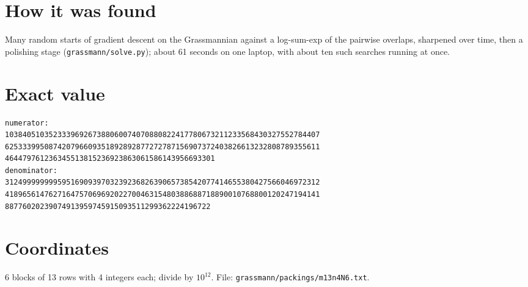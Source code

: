 \documentclass[11pt,a4paper]{article}
\begin{document}
\section{How it was found}
Many random starts of gradient descent on the Grassmannian against a log-sum-exp of the pairwise overlaps, sharpened over time, then a polishing stage (\texttt{grassmann/solve.py}); about 61 seconds on one laptop, with about ten such searches running at once.


\appendix
\section{Exact value}
{\small
\begin{verbatim}
numerator:
103840510352333969267388060074070880822417780673211233568430327552784407
625333995087420796609351892892877272787156907372403826613232808789355611
464479761236345513815236923863061586143956693301
denominator:
312499999999595169093970323923682639065738542077414655380427566046972312
418965614762716475706969202270046315480388688718890010768800120247194141
88776020239074913959745915093511299362224196722
\end{verbatim}}

\section{Coordinates}
6 blocks of 13 rows with 4 integers each; divide by $10^{12}$. File: \texttt{grassmann/packings/m13n4N6.txt}.
{\tiny
\begin{multicols}{3}
\end{multicols}}
\end{document}
